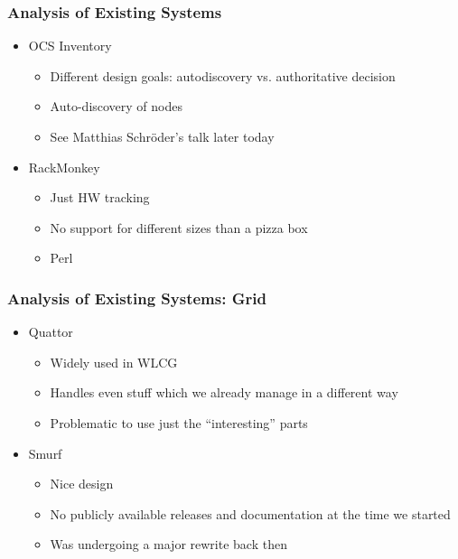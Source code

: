 \documentclass{beamer}
\begin{document}
\begin{frame}[fragile]
\frametitle{Analysis of Existing Systems}
\begin{itemize}
    \item OCS Inventory
        \begin{itemize}
            \item Different design goals: autodiscovery vs. authoritative decision
            \item Auto-discovery of nodes
            \item See Matthias Schröder's talk later today
        \end{itemize}
    \item RackMonkey
        \begin{itemize}
            \item Just HW tracking
            \item No support for different sizes than a pizza box
            \item Perl
        \end{itemize}
\end{itemize}
\end{frame}

\begin{frame}[fragile]
\frametitle{Analysis of Existing Systems: Grid}
\begin{itemize}
    \item Quattor
        \begin{itemize}
            \item Widely used in WLCG
            \item Handles even stuff which we already manage in a different way
            \item Problematic to use just the ``interesting'' parts
        \end{itemize}
    \item Smurf
        \begin{itemize}
            \item Nice design
            \item No publicly available releases and documentation at the time we started
            \item Was undergoing a major rewrite back then
        \end{itemize}
\end{itemize}
\end{frame}
\end{document}
